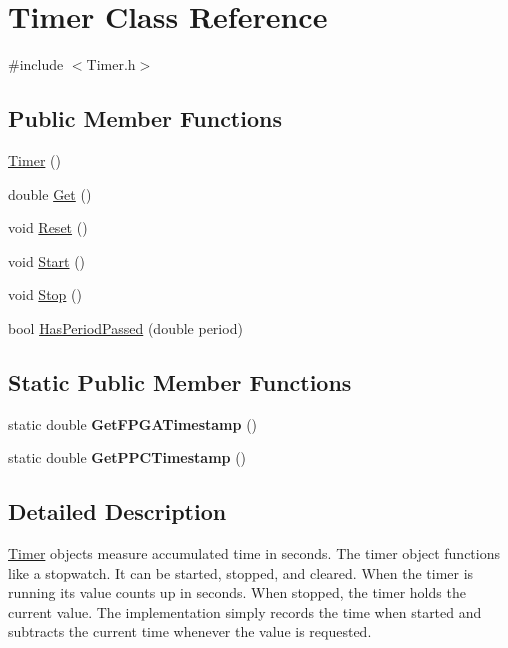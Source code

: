 \hypertarget{classTimer}{
\section{Timer Class Reference}
\label{classTimer}
}


{\ttfamily \#include $<$Timer.h$>$}

\subsection*{Public Member Functions}
\begin{DoxyCompactItemize}
\item 
\hyperlink{classTimer_a5f16e8da27d2a5a5242dead46de05d97}{Timer} ()
\item 
double \hyperlink{classTimer_aadc180bcac64bc164f134d9c8076e1a3}{Get} ()
\item 
void \hyperlink{classTimer_ae7c0c1e7d12de4b8a6e7c64e451cdd2a}{Reset} ()
\item 
void \hyperlink{classTimer_a4e607b129b392c11adddd9641a320436}{Start} ()
\item 
void \hyperlink{classTimer_a6379e797f968aaee6ac3bb12dc6b81c5}{Stop} ()
\item 
bool \hyperlink{classTimer_a044e56cf40905d2f5037745e44cc3881}{HasPeriodPassed} (double period)
\end{DoxyCompactItemize}
\subsection*{Static Public Member Functions}
\begin{DoxyCompactItemize}
\item 
\hypertarget{classTimer_a7fa6e6dffec055e5104ccd6bcadec9aa}{
static double {\bfseries GetFPGATimestamp} ()}
\label{classTimer_a7fa6e6dffec055e5104ccd6bcadec9aa}

\item 
\hypertarget{classTimer_a6a326db4fa89871033bda5a0538c77c4}{
static double {\bfseries GetPPCTimestamp} ()}
\label{classTimer_a6a326db4fa89871033bda5a0538c77c4}

\end{DoxyCompactItemize}


\subsection{Detailed Description}
\hyperlink{classTimer}{Timer} objects measure accumulated time in seconds. The timer object functions like a stopwatch. It can be started, stopped, and cleared. When the timer is running its value counts up in seconds. When stopped, the timer holds the current value. The implementation simply records the time when started and subtracts the current time whenever the value is requested. 


